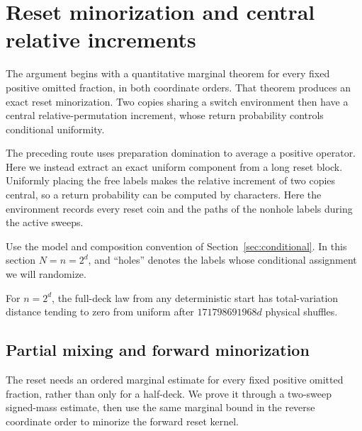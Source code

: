 \section{Reset minorization and central relative increments}

\label{special:reset}

The argument begins with a quantitative marginal theorem for every fixed positive omitted fraction, in both coordinate orders. That theorem produces an exact reset minorization. Two copies sharing a switch environment then have a central relative-permutation increment, whose return probability controls conditional uniformity.

The preceding route uses preparation domination to average a positive operator. Here we instead extract an exact uniform component from a long reset block. Uniformly placing the free labels makes the relative increment of two copies central, so a return probability can be computed by characters. Here the environment records every reset coin and the paths of the nonhole labels during the active sweeps.

Use the model and composition convention of Section~\ref{sec:conditional}. In this section $N=n=2^d$, and ``holes'' denotes the labels whose conditional assignment we will randomize.

\begin{theorem}\label{thm:reset}
For $n=2^d$, the full-deck law from any deterministic start has total-variation distance tending to zero from uniform after $171798691968d$ physical shuffles.
\end{theorem}

\subsection{Partial mixing and forward minorization}

The reset needs an ordered marginal estimate for every fixed positive omitted fraction, rather than only for a half-deck. We prove it through a two-sweep signed-mass estimate, then use the same marginal bound in the reverse coordinate order to minorize the forward reset kernel.

